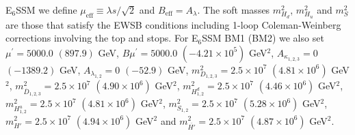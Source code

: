 \documentclass[preprint,amsmath,amssymb,aps,superscriptaddress,prd,
showpacs,floatfix,nofootinbib]{revtex4-1}
\begin{document}
\begin{table}[h]
{E$_6$SSM we define $\mu_{\mathrm{eff}} \equiv \lambda s/\sqrt{2}$ and
$B_{\mathrm{eff}} = A_\lambda$.  The soft masses $m_{H_d}^2$, $m_{H_u}^2$
and $m_S^2$ are those that satisfy the EWSB conditions including 1-loop
Coleman-Weinberg corrections involving the top and stops.  For E$_6$SSM BM1
(BM2) we also set $\mu^\prime = 5000.0$ $(897.9)$ GeV, $B\mu^\prime = 5000.0$
$(-4.21\times 10^5)$ GeV$^2$, $A_{\kappa_{1,2,3}} = 0$ $(-1389.2)$ GeV,
$A_{\lambda_{1,2}} = 0$ $(-52.9)$ GeV, $m_{D_{1,2,3}}^2 = 2.5\times 10^7$
$(4.81\times 10^6)$ GeV$^2$, $m_{\overline{D}_{1,2,3}}^2 = 2.5\times 10^7$
$(4.90\times 10^6)$ GeV$^2$, $m_{H^d_{1,2}}^2 = 2.5\times 10^7$
$(4.46\times 10^6)$ GeV$^2$, $m_{H^u_{1,2}}^2 = 2.5\times 10^7$
$(4.81\times 10^6)$ GeV$^2$, $m_{S_{1,2}}^2 = 2.5\times 10^7$
$(5.28\times 10^6)$ GeV$^2$, $m_{H'}^2 = 2.5\times 10^7$ $(4.94\times 10^6)$
GeV$^2$ and $m_{\overline{H'}}^2 = 2.5\times 10^7$ $(4.87\times 10^6)$ GeV$^2$.}
\label{tab:benchmarks}
\end{table}
\endgroup
\end{document}

